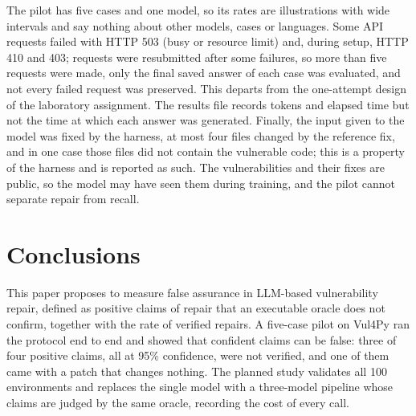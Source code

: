 \documentclass[ai,article,submit,oneauthor]{Definitions/mdpi}
\begin{document}
The pilot has five cases and one model, so its rates are illustrations with wide intervals and say nothing about other models, cases or languages. Some API requests failed with HTTP 503 (busy or resource limit) and, during setup, HTTP 410 and 403; requests were resubmitted after some failures, so more than five requests were made, only the final saved answer of each case was evaluated, and not every failed request was preserved. This departs from the one-attempt design of the laboratory assignment. The results file records tokens and elapsed time but not the time at which each answer was generated. Finally, the input given to the model was fixed by the harness, at most four files changed by the reference fix, and in one case those files did not contain the vulnerable code; this is a property of the harness and is reported as such. The vulnerabilities and their fixes are public, so the model may have seen them during training, and the pilot cannot separate repair from recall.

\section{Conclusions}\label{sec:conclusions}

This paper proposes to measure false assurance in LLM-based vulnerability repair, defined as positive claims of repair that an executable oracle does not confirm, together with the rate of verified repairs. A five-case pilot on Vul4Py ran the protocol end to end and showed that confident claims can be false: three of four positive claims, all at 95\% confidence, were not verified, and one of them came with a patch that changes nothing. The planned study validates all 100 environments and replaces the single model with a three-model pipeline whose claims are judged by the same oracle, recording the cost of every call.

\vspace{6pt}





\end{document}
